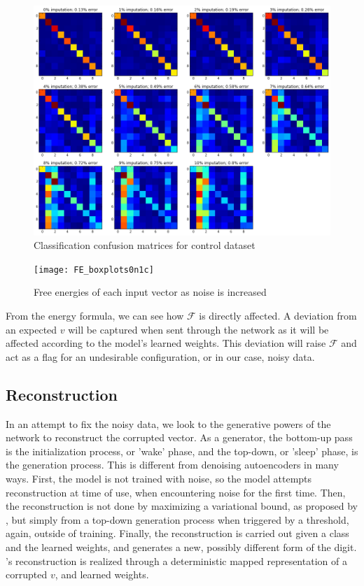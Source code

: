 \documentclass{report}
\begin{document}
\begin{figure}
\begin{center}
	\includegraphics[width=\textwidth]{confusion_matrices}
	\caption{Classification confusion matrices for control dataset}
	\label{fig:CM}
\end{center}
\end{figure}

\begin{figure}
	\centering
		\texttt{[image: FE\_boxplots0n1c]}
	\caption{Free energies of each input vector as noise is increased}
	\label{fig:nrgs}
\end{figure}


From the energy formula, we can see how $\mathcal{F}$ is directly affected. A deviation from an expected $v$ will be captured when sent through the network as it will be affected according to the model's learned weights. This deviation will raise $\mathcal{F}$ and act as a flag for an undesirable configuration, or in our case, noisy data.


\subsection{Reconstruction}
In an attempt to fix the noisy data, we look to the generative powers of the network to reconstruct the corrupted vector. As a generator, the bottom-up pass is the initialization process, or 'wake' phase, and the top-down, or 'sleep' phase, is the generation process. This is different from denoising autoencoders in many ways. First, the model is not trained with noise, so the model attempts reconstruction at time of use, when encountering noise for the first time. Then, the reconstruction is not done by maximizing a variational bound, as proposed by \citet{Vincent}, but simply from a top-down generation process when triggered by a threshold, again, outside of training. Finally, the reconstruction is carried out given a class and the learned weights, and generates a new, possibly different form of the digit. \citet{Vincent}'s reconstruction is realized through a deterministic mapped representation of a corrupted $v$, and learned weights.
\end{document}
